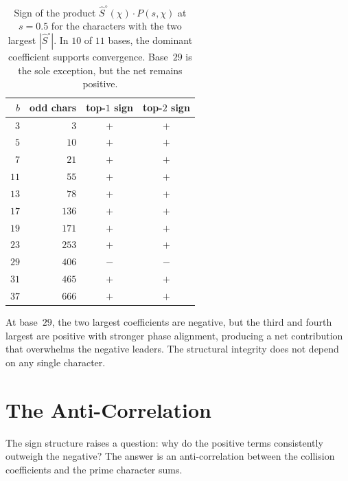 \documentclass[12pt]{amsart}
\theoremstyle{definition}
\theoremstyle{remark}
\begin{document}
\begin{table}[h]
\centering
\begin{tabular}{rrcc}
\toprule
$b$ & odd chars & top-$1$ sign & top-$2$ sign \\
\midrule
$3$ & $3$ & $+$ & $+$ \\
$5$ & $10$ & $+$ & $+$ \\
$7$ & $21$ & $+$ & $+$ \\
$11$ & $55$ & $+$ & $+$ \\
$13$ & $78$ & $+$ & $+$ \\
$17$ & $136$ & $+$ & $+$ \\
$19$ & $171$ & $+$ & $+$ \\
$23$ & $253$ & $+$ & $+$ \\
$29$ & $406$ & $-$ & $-$ \\
$31$ & $465$ & $+$ & $+$ \\
$37$ & $666$ & $+$ & $+$ \\
\bottomrule
\end{tabular}
\caption{Sign of the product
$\hat{S}^{\circ}(\chi) \cdot P(s, \chi)$ at $s = 0.5$
for the characters with the two largest
$|\hat{S}^{\circ}|$. In $10$ of $11$ bases, the
dominant coefficient supports convergence. Base~$29$
is the sole exception, but the net remains positive.}
\label{tab:dominant}
\end{table}

At base~$29$, the two largest coefficients are
negative, but the third and fourth largest are positive
with stronger phase alignment, producing a net
contribution that overwhelms the negative leaders.
The structural integrity does not depend on any single
character.

\section{The Anti-Correlation}

The sign structure raises a question: why do the
positive terms consistently outweigh the negative?
The answer is an anti-correlation between the
collision coefficients and the prime character sums.
\end{document}
